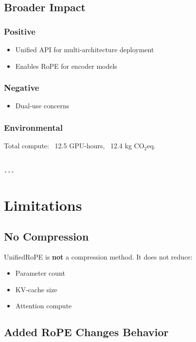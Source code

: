 \subsection{Broader Impact}

\subsubsection{Positive}
\begin{itemize}
\item Unified API for multi-architecture deployment
\item Enables RoPE for encoder models

\end{itemize}
\subsubsection{Negative}
\begin{itemize}
\item Dual-use concerns

\end{itemize}
\subsubsection{Environmental}
Total compute: ~12.5 GPU-hours, ~12.4 kg CO$_2$eq.
\begin{lstlisting}

---
\end{lstlisting}


\section{Limitations}

\subsection{No Compression}

UnifiedRoPE is \textbf{not} a compression method. It does not reduce:
\begin{itemize}
\item Parameter count
\item KV-cache size
\item Attention compute

\end{itemize}
\subsection{Added RoPE Changes Behavior}

